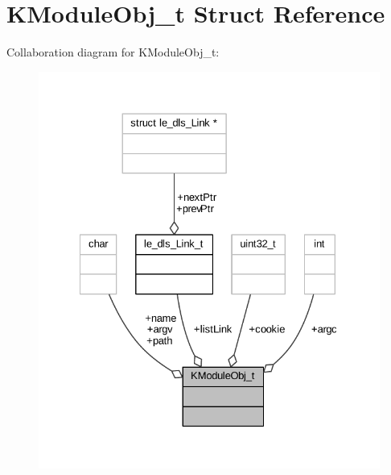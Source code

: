 \hypertarget{struct_k_module_obj__t}{}\section{K\+Module\+Obj\+\_\+t Struct Reference}
\label{struct_k_module_obj__t}


Collaboration diagram for K\+Module\+Obj\+\_\+t\+:
\nopagebreak
\begin{figure}[H]
\begin{center}
\leavevmode
\includegraphics[width=328pt]{struct_k_module_obj__t__coll__graph}
\end{center}
\end{figure}
